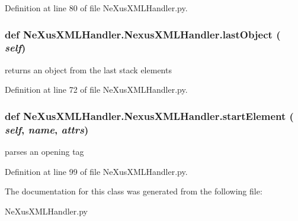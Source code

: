 Definition at line 80 of file NeXusXMLHandler.py.\hypertarget{classNeXusXMLHandler_1_1NexusXMLHandler_a93964a4084ced8a69557dd2f08db8a37}{
\subsubsection[{lastObject}]{\setlength{\rightskip}{0pt plus 5cm}def NeXusXMLHandler.NexusXMLHandler.lastObject ( {\em self})}}
\label{classNeXusXMLHandler_1_1NexusXMLHandler_a93964a4084ced8a69557dd2f08db8a37}
\begin{DoxyVerb}returns an object from the last stack elements \end{DoxyVerb}
 

Definition at line 72 of file NeXusXMLHandler.py.\hypertarget{classNeXusXMLHandler_1_1NexusXMLHandler_a8259fda2b54bbec9c7b769ce747dd71e}{
\subsubsection[{startElement}]{\setlength{\rightskip}{0pt plus 5cm}def NeXusXMLHandler.NexusXMLHandler.startElement ( {\em self}, \/   {\em name}, \/   {\em attrs})}}
\label{classNeXusXMLHandler_1_1NexusXMLHandler_a8259fda2b54bbec9c7b769ce747dd71e}
\begin{DoxyVerb}parses an opening tag\end{DoxyVerb}
 

Definition at line 99 of file NeXusXMLHandler.py.

The documentation for this class was generated from the following file:\begin{DoxyCompactItemize}
\item 
NeXusXMLHandler.py\end{DoxyCompactItemize}
